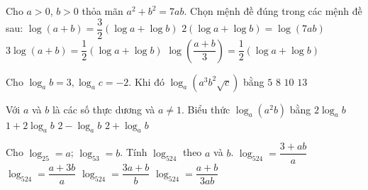 \begin{ex}%
	Cho $ a > 0$, $b  > 0 $ thỏa mãn $ a^2+b^2 = 7ab $. Chọn mệnh đề đúng trong các mệnh đề sau:
	\choice 
		{$\log (a+b) = \dfrac{3}{2} \left(\log  a+\log b\right)$}
		{$2 \left(\log a+\log b\right) = \log  (7ab) $}
		{$3 \log (a+b) = \dfrac{1}{2} \left(\log  a+\log b\right)$}
		{\True $\log  \left(\dfrac{a+b}{3} \right) = \dfrac{1}{2} \left(\log a+\log b\right)$}
\end{ex}

\begin{ex}%
	Cho $\log_ab=3,\log_ac=-2$. Khi đó $\log_a\left(a^3b^2\sqrt c\right)$  bằng
	\choice 
		{$  5$}
		{\True  $ 8$}
		 {$ 10$}
		{$ 13$} 
\end{ex}

\begin{ex}%
	Với $a$ và $b$ là các số thực dương và $a \neq 1$. Biểu thức $\log _{a}\left(a^2 b\right)$  bằng
	\choice 
		{$2 \log  _{a}b$}
		{$1+2 \log _{a}b$} 
		 {$2-\log _{a}b$}
		{\True $2+\log  _{a}b$}
\end{ex}

\begin{ex}%
	 Cho $\log_25=a$; $\log_53=b$. Tính $\log_524$ theo $a$ và $b$.
	\choice 
		{\True  $\log_524=\dfrac{3+ab}{a}$}
		{$\log_524=\dfrac{a+3b}{a}$} 
		{$\log_524=\dfrac{3a+b}{b}$} 
		 {$\log_524=\dfrac{a+b}{3ab}$}
\end{ex}

